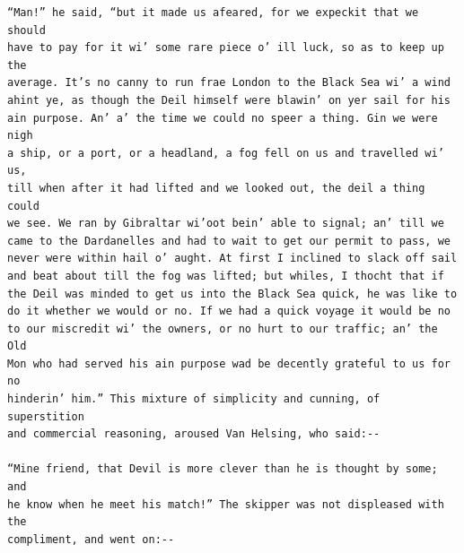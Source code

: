 \documentclass{article}
\begin{document}
\begin{verbatim}
“Man!” he said, “but it made us afeared, for we expeckit that we should
have to pay for it wi’ some rare piece o’ ill luck, so as to keep up the
average. It’s no canny to run frae London to the Black Sea wi’ a wind
ahint ye, as though the Deil himself were blawin’ on yer sail for his
ain purpose. An’ a’ the time we could no speer a thing. Gin we were nigh
a ship, or a port, or a headland, a fog fell on us and travelled wi’ us,
till when after it had lifted and we looked out, the deil a thing could
we see. We ran by Gibraltar wi’oot bein’ able to signal; an’ till we
came to the Dardanelles and had to wait to get our permit to pass, we
never were within hail o’ aught. At first I inclined to slack off sail
and beat about till the fog was lifted; but whiles, I thocht that if
the Deil was minded to get us into the Black Sea quick, he was like to
do it whether we would or no. If we had a quick voyage it would be no
to our miscredit wi’ the owners, or no hurt to our traffic; an’ the Old
Mon who had served his ain purpose wad be decently grateful to us for no
hinderin’ him.” This mixture of simplicity and cunning, of superstition
and commercial reasoning, aroused Van Helsing, who said:--

“Mine friend, that Devil is more clever than he is thought by some; and
he know when he meet his match!” The skipper was not displeased with the
compliment, and went on:--


\end{verbatim}
\end{document}
